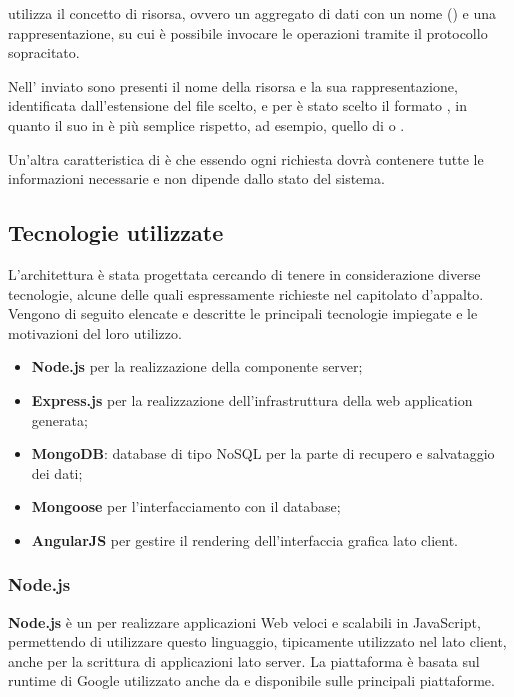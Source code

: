  utilizza il concetto di risorsa, ovvero un aggregato di dati con un nome () e una rappresentazione, su cui è possibile invocare le operazioni  tramite il protocollo sopracitato.

Nell' inviato sono presenti il nome della risorsa e la sua rappresentazione, identificata dall'estensione del file scelto, e per \ProjectName è stato scelto il formato , in quanto il suo  in  è più semplice rispetto, ad esempio, quello di  o .

Un'altra caratteristica di  è che essendo  ogni richiesta dovrà contenere tutte le informazioni necessarie e non dipende dallo stato del sistema.

\subsection{Tecnologie utilizzate}
L'architettura è stata progettata cercando di tenere in considerazione diverse tecnologie, alcune delle quali espressamente richieste nel capitolato d'appalto. Vengono di seguito elencate e descritte le principali tecnologie impiegate e le motivazioni del loro utilizzo.

\begin{itemize}
	\item \textbf{Node.js} per la realizzazione della componente server;
	\item \textbf{Express.js} per la realizzazione dell’infrastruttura della web application generata;
	\item \textbf{MongoDB}: database di tipo NoSQL per la parte di recupero e salvataggio dei dati;
	\item \textbf{Mongoose} per l’interfacciamento con il database;
	\item \textbf{AngularJS} per gestire il rendering dell'interfaccia grafica lato client.
\end{itemize}


\subsubsection{Node.js}
\textbf{Node.js} è un  per realizzare applicazioni Web veloci e scalabili in JavaScript, permettendo di utilizzare questo linguaggio, tipicamente utilizzato nel lato client, anche per la scrittura di applicazioni lato server.
La piattaforma è basata sul runtime di Google  utilizzato anche da  e disponibile sulle principali piattaforme.


